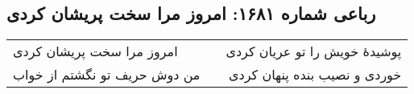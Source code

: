\begin{center}
\section*{رباعی شماره ۱۶۸۱: امروز مرا سخت پریشان کردی}
\label{sec:1681}
\begin{longtable}{l p{0.5cm} r}
امروز مرا سخت پریشان کردی
&&
پوشیدهٔ خویش را تو عریان کردی
\\
من دوش حریف تو نگشتم از خواب
&&
خوردی و نصیب بنده پنهان کردی
\\
\end{longtable}
\end{center}
